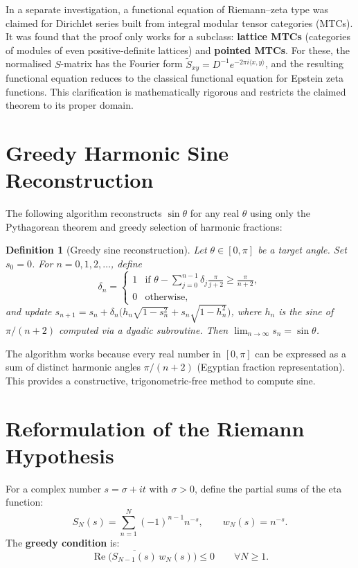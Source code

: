 \documentclass[12pt,a4paper]{article}
\newtheorem{definition}[theorem]{Definition}
\begin{document}
In a separate investigation, a functional equation of Riemann–zeta type was claimed for Dirichlet series built from integral modular tensor categories (MTCs). It was found that the proof only works for a subclass: \textbf{lattice MTCs} (categories of modules of even positive‑definite lattices) and \textbf{pointed MTCs}. For these, the normalised $S$-matrix has the Fourier form $\tilde S_{xy}=D^{-1}e^{-2\pi i\langle x,y\rangle}$, and the resulting functional equation reduces to the classical functional equation for Epstein zeta functions. This clarification is mathematically rigorous and restricts the claimed theorem to its proper domain.

\section{Greedy Harmonic Sine Reconstruction}

The following algorithm reconstructs $\sin\theta$ for any real $\theta$ using only the Pythagorean theorem and greedy selection of harmonic fractions:

\begin{definition}[Greedy sine reconstruction]
Let $\theta\in[0,\pi]$ be a target angle. Set $s_0=0$. For $n=0,1,2,\dots$, define
\[
\delta_n = \begin{cases}
1 & \text{if } \theta - \sum_{j=0}^{n-1}\delta_j\frac{\pi}{j+2} \ge \frac{\pi}{n+2},\\
0 & \text{otherwise},
\end{cases}
\]
and update $s_{n+1}=s_n + \delta_n\bigl( h_n\sqrt{1-s_n^2} + s_n\sqrt{1-h_n^2}\bigr)$, where $h_n$ is the sine of $\pi/(n+2)$ computed via a dyadic subroutine. Then $\lim_{n\to\infty}s_n = \sin\theta$.
\end{definition}

The algorithm works because every real number in $[0,\pi]$ can be expressed as a sum of distinct harmonic angles $\pi/(n+2)$ (Egyptian fraction representation). This provides a constructive, trigonometric‑free method to compute sine.

\section{Reformulation of the Riemann Hypothesis}

For a complex number $s=\sigma+it$ with $\sigma>0$, define the partial sums of the eta function:
\[
S_N(s)=\sum_{n=1}^N (-1)^{n-1} n^{-s},\qquad w_N(s)=n^{-s}.
\]
The \textbf{greedy condition} is:
\[
\operatorname{Re}\bigl(\overline{S_{N-1}(s)}\,w_N(s)\bigr)\le 0 \qquad \forall N\ge1.
\]
\end{document}

